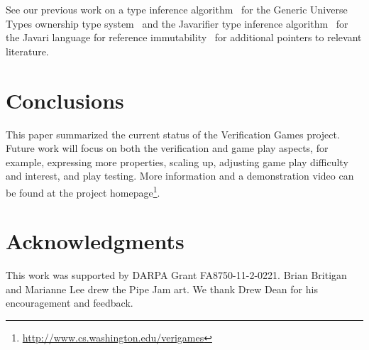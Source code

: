 \documentclass{sig-alternate}
\begin{document}
% 

\medskip

See our previous work on a type inference
algorithm~\cite{DietlEM2011} for the Generic Universe Types
ownership type system~\cite{DietlPhD09}
and the Javarifier type inference
algorithm~\cite{Tschantz2006,QuinonezTE2008} for the Javari language
for reference immutability~\cite{BirkaE2004,TschantzE2005}
for additional pointers to relevant literature.



\section{Conclusions}
\label{sec:conclusions}

This paper summarized the current status of the Verification
Games project.
Future work will focus on both the verification and game play aspects,
for example, expressing more properties, scaling up, adjusting game
play difficulty and interest, and play testing.
More information and a demonstration video can be found at the project
homepage\footnote{\url{http://www.cs.washington.edu/verigames}}.


\section*{Acknowledgments}
 
This work was supported by DARPA Grant FA8750-11-2-0221.  Brian Britigan
and Marianne Lee drew the Pipe Jam art.  We thank Drew Dean for his
encouragement and feedback.


\pagebreak




\balancecolumns
\end{document}
